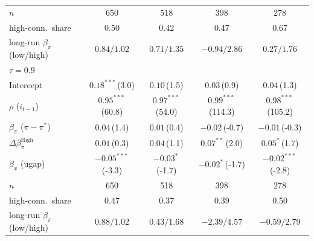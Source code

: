 \begin{tabular}{lcccc}
\addlinespace
$n$ & 650 & 518 & 398 & 278 \\
high-conn.\ share & 0.50 & 0.42 & 0.47 & 0.67 \\
long-run $\beta_\pi$ (low/high) & $0.84/1.02$ & $0.71/1.35$ & $-0.94/2.86$ & $0.27/1.76$ \\
\midrule
\multicolumn{5}{l}{\textit{$\tau=0.9$}} \\
Intercept & $0.18^{***}$\,{\scriptsize(3.0)} & $0.10$\,{\scriptsize(1.5)} & $0.03$\,{\scriptsize(0.9)} & $0.04$\,{\scriptsize(1.3)} \\
$\rho$ ($i_{t-1}$) & $0.95^{***}$\,{\scriptsize(60.8)} & $0.97^{***}$\,{\scriptsize(54.0)} & $0.99^{***}$\,{\scriptsize(114.3)} & $0.98^{***}$\,{\scriptsize(105.2)} \\
$\beta_\pi$ ($\pi-\pi^*$) & $0.04$\,{\scriptsize(1.4)} & $0.01$\,{\scriptsize(0.4)} & $-0.02$\,{\scriptsize(-0.7)} & $-0.01$\,{\scriptsize(-0.3)} \\
$\Delta\beta_\pi^{\text{High}}$ & $0.01$\,{\scriptsize(0.3)} & $0.04$\,{\scriptsize(1.1)} & $0.07^{**}$\,{\scriptsize(2.0)} & $0.05^{*}$\,{\scriptsize(1.7)} \\
$\beta_x$ (ugap) & $-0.05^{***}$\,{\scriptsize(-3.3)} & $-0.03^{*}$\,{\scriptsize(-1.7)} & $-0.02^{*}$\,{\scriptsize(-1.7)} & $-0.02^{***}$\,{\scriptsize(-2.8)} \\
\addlinespace
$n$ & 650 & 518 & 398 & 278 \\
high-conn.\ share & 0.47 & 0.37 & 0.39 & 0.50 \\
long-run $\beta_\pi$ (low/high) & $0.88/1.02$ & $0.43/1.68$ & $-2.39/4.57$ & $-0.59/2.79$ \\
\bottomrule
\end{tabular}
